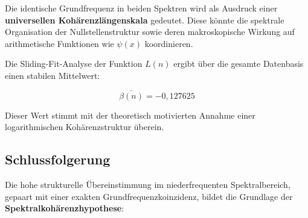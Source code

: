 \documentclass[12pt]{article}
\begin{document}
Die identische Grundfrequenz in beiden Spektren wird als Ausdruck einer \textbf{universellen Kohärenzlängenskala} gedeutet. Diese könnte die spektrale Organisation der Nullstellenstruktur sowie deren makroskopische Wirkung auf arithmetische Funktionen wie $\psi(x)$ koordinieren.

Die Sliding-Fit-Analyse der Funktion $L(n)$ ergibt über die gesamte Datenbasis einen stabilen Mittelwert:

\begin{equation}
\boxed{\bar{\beta(n)} = -0{,}127625}
\end{equation}

Dieser Wert stimmt mit der theoretisch motivierten Annahme einer logarithmischen Kohärenzstruktur überein.

\subsection*{Schlussfolgerung}

Die hohe strukturelle Übereinstimmung im niederfrequenten Spektralbereich, gepaart mit einer exakten Grundfrequenzkoinzidenz, bildet die Grundlage der \textbf{Spektralkohärenzhypothese}:
\end{document}

